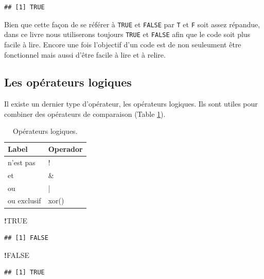 \documentclass[]{book}
\newenvironment{Shaded}{\begin{snugshade}}{\end{snugshade}}
\newcommand{\OperatorTok}[1]{\textcolor[rgb]{0.81,0.36,0.00}{\textbf{#1}}}
\newcommand{\OtherTok}[1]{\textcolor[rgb]{0.56,0.35,0.01}{#1}}
\begin{document}
\begin{verbatim}
## [1] TRUE
\end{verbatim}

Bien que cette façon de se référer à \texttt{TRUE} et \texttt{FALSE} par \texttt{T} et \texttt{F} soit assez répandue, dans ce livre nous utiliserons toujours \texttt{TRUE} et \texttt{FALSE} afin que le code soit plus facile à lire. Encore une fois l'objectif d'un code est de non seuleument être fonctionnel mais aussi d'être facile à lire et à relire.

\hypertarget{l011oplog}{%
\subsection{Les opérateurs logiques}\label{l011oplog}}

Il existe un dernier type d'opérateur, les opérateurs logiques. Ils sont utiles pour combiner des opérateurs de comparaison (Table \ref{tab:tabOpLog}).

\begin{table}[t]

\caption{\label{tab:tabOpLog}Opérateurs logiques.\label{tab:tabOpLog}}
\centering
\begin{tabular}{l|l}
\hline
Label & Operador\\
\hline
n'est pas & !\\
\hline
et & \&\\
\hline
ou & |\\
\hline
ou exclusif & xor()\\
\hline
\end{tabular}
\end{table}

\begin{Shaded}
\begin{Highlighting}[]
\OperatorTok{!}\OtherTok{TRUE}
\end{Highlighting}
\end{Shaded}

\begin{verbatim}
## [1] FALSE
\end{verbatim}

\begin{Shaded}
\begin{Highlighting}[]
\OperatorTok{!}\OtherTok{FALSE}
\end{Highlighting}
\end{Shaded}

\begin{verbatim}
## [1] TRUE
\end{verbatim}
\end{document}
